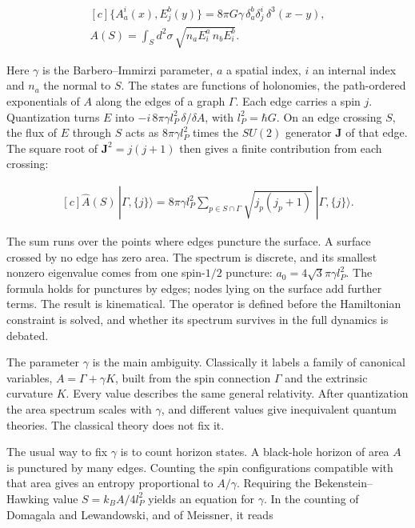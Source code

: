 \documentclass[11pt,oneside]{book}
\newenvironment{centeredalign}{\[\begin{gathered}[c]}{\end{gathered}\]}
\begin{document}
\begin{centeredalign}
\{A^i_a(x),E^b_j(y)\}=8\pi G\gamma\,\delta^b_a\delta^i_j\,\delta^3(x-y),\\
A(S)=\int_Sd^2\sigma\,\sqrt{n_aE^a_i\,n_bE^b_i}.
\end{centeredalign}

Here \(\gamma\) is the Barbero--Immirzi parameter, \(a\) a spatial index, \(i\) an internal index and \(n_a\) the normal to \(S\). The states are functions of holonomies, the path-ordered exponentials of \(A\) along the edges of a graph \(\Gamma\). Each edge carries a spin \(j\). Quantization turns \(E\) into \(-i\,8\pi\gamma l_P^2\,\delta/\delta A\), with \(l_P^2=\hbar G\). On an edge crossing \(S\), the flux of \(E\) through \(S\) acts as \(8\pi\gamma l_P^2\) times the \(SU(2)\) generator \(\mathbf J\) of that edge. The square root of \(\mathbf J^2=j(j+1)\) then gives a finite contribution from each crossing:

\begin{centeredalign}
\hat A(S)\,|\Gamma,\{j\}\rangle=8\pi\gamma l_P^2\sum_{p\in S\cap\Gamma}\sqrt{j_p(j_p+1)}\;|\Gamma,\{j\}\rangle.
\end{centeredalign}

The sum runs over the points where edges puncture the surface. A surface crossed by no edge has zero area. The spectrum is discrete, and its smallest nonzero eigenvalue comes from one spin-\(1/2\) puncture: \(a_0=4\sqrt3\pi\gamma l_P^2\). The formula holds for punctures by edges; nodes lying on the surface add further terms. The result is kinematical. The operator is defined before the Hamiltonian constraint is solved, and whether its spectrum survives in the full dynamics is debated.

The parameter \(\gamma\) is the main ambiguity. Classically it labels a family of canonical variables, \(A=\Gamma+\gamma K\), built from the spin connection \(\Gamma\) and the extrinsic curvature \(K\). Every value describes the same general relativity. After quantization the area spectrum scales with \(\gamma\), and different values give inequivalent quantum theories. The classical theory does not fix it.

The usual way to fix \(\gamma\) is to count horizon states. A black-hole horizon of area \(A\) is punctured by many edges. Counting the spin configurations compatible with that area gives an entropy proportional to \(A/\gamma\). Requiring the Bekenstein--Hawking value \(S=k_BA/4l_P^2\) yields an equation for \(\gamma\). In the counting of Domagala and Lewandowski, and of Meissner, it reads
\end{document}
